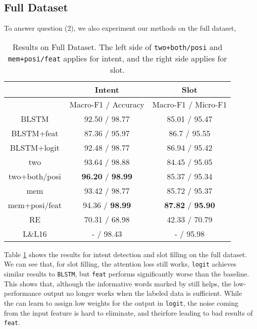 

\subsection{Full Dataset}
To answer question (2), we also experiment our methods on the full dataset, 

\begin{table}
\setlength{\tabcolsep}{0.23em}
\centering
\small{
\begin{tabular}{|c|c|c|}

\hline
 & Intent & Slot \\ 
\hline
  & Macro-F1 / Accuracy &  Macro-F1 / Micro-F1 \\
\hline
BLSTM & 92.50 / 98.77  & 85.01 / 95.47\\
\hline
BLSTM+feat & 87.36 / 95.97 & 86.7 / 95.55\\
\hline
BLSTM+logit & 92.48 / 98.77 & 86.94 / 95.42  \\
\hline
two & 93.64 / 98.88  & 84.45 / 95.05\\
\hline
two+both/posi & \textbf{96.20} / \textbf{98.99} & 85.37 / 95.34 \\
\hline
mem & 93.42 / 98.77 & 85.72 / 95.37\\
\hline
mem+posi/feat & 94.36 / \textbf{98.99} & \textbf{87.82} / \textbf{95.90} \\
\hline
\hline
RE & 70.31 / 68.98 & 42.33 / 70.79\\
\hline
L\&L16 & - / 98.43 & - / 95.98\\
\hline 

\end{tabular}
}
\caption{Results on Full Dataset. The left side of \texttt{two+both/posi} and \texttt{mem+posi/feat} applies for intent, and the right side applies for slot.} 
\label{tab_full}
\end{table}

Table \ref{tab_full} shows the results for intent detection and slot filling on the full dataset. We can see that, for slot filling, the attention loss still works, \texttt{logit} achieves similar results to \texttt{BLSTM}, but \texttt{feat} performs significantly worse than the baseline. This shows that, although the informative words marked by \RE still helps, the low-performance \RE output no longer works when the labeled data is sufficient. While the \NN can learn to assign low weights for the \RE output in \texttt{logit}, the noise coming from the input feature is hard to eliminate, and theirfore leading to bad results of \texttt{feat}.

